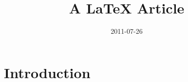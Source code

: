 \documentclass[slidestop,compress,mathserif]{beamer}
\title{A LaTeX Article}
\author{  }
\date{2011-07-26}
\begin{document}
\ifpdf
{}
\else
{}
\fi

\maketitle


\begin{abstract}
\end{abstract}

\section{Introduction}



\end{document}
